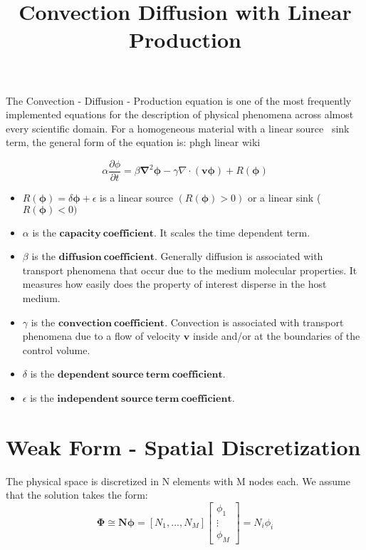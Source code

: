 \documentclass{article}
\title{Convection Diffusion with Linear Production}
\author{ }
\begin{document}
	
\maketitle	
The Convection - Diffusion - Production equation is one of the most frequently implemented equations for the description of physical phenomena across almost every scientific domain. For a homogeneous material with a linear source \ sink term, the general form of the equation is: phgh linear wiki

\begin{equation}
	\alpha \frac{\partial \phi}{\partial t} = 
	\beta \boldsymbol{\nabla}^2 \boldsymbol{\phi}
	- \gamma \nabla \cdot (\boldsymbol{v} \boldsymbol{\phi})
	+ R(\boldsymbol{\phi})
\end{equation}	

\begin{itemize}
	\item $R(\boldsymbol{\phi}) = \delta \boldsymbol{\phi} + \epsilon$ is a linear source $(R(\boldsymbol{\phi}) > 0)$ or a linear sink ($R(\boldsymbol{\phi}) < 0)$	
	\item $\alpha$ is the $\boldsymbol{capacity \  coefficient}$. It scales the time dependent term.
	\item $\beta$  is the $\boldsymbol{diffusion \  coefficient}$. Generally diffusion is associated with transport phenomena that occur due to the medium molecular properties. It measures how easily does the property of interest disperse  in the host medium. 
	\item $\gamma$ is the $\boldsymbol{convection\  coefficient}$. Convection is associated with transport phenomena due to a flow of velocity $\boldsymbol{v}$ inside and/or at the boundaries of the control volume.
	\item $\delta$ is the $\boldsymbol{dependent \ source \ term \ coefficient}$.
	\item $\epsilon$ is the $\boldsymbol{independent \ source \ term \ coefficient}$.
\end{itemize}


\section{Weak Form - Spatial Discretization}


The physical space is discretized in N elements with M nodes each. We assume that the solution takes the form:
\begin{equation} \label{eq:TiNi}
	\boldsymbol{\Phi} \cong{\boldsymbol {N\phi} = [ N_1,...,N_M] \begin{bmatrix} \phi_1\\ \vdots \\ \phi_M \end{bmatrix} = N_i\phi_i}
\end{equation}
\end{document}
